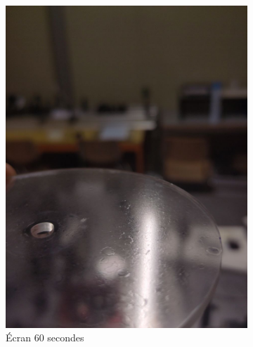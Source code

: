 \begin{figure}[H]
    \centering
    \begin{subfigure}{.5\textwidth}
        \centering
        \includegraphics[width=1\linewidth]{assets/figures/mesures/60_sec.jpeg}
        \caption{Écran 60 secondes}
    \end{subfigure}%
    \begin{subfigure}{.5\textwidth}
        \centering

\end{subfigure}
\end{figure}
